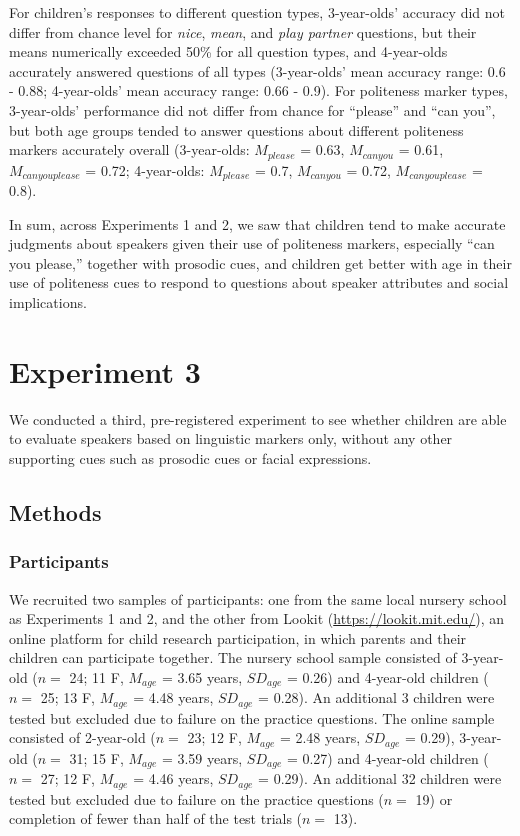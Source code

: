 \documentclass[10pt, letterpaper]{article}
\begin{document}
For children's responses to different question types, 3-year-olds'
accuracy did not differ from chance level for \emph{nice}, \emph{mean},
and \emph{play partner} questions, but their means numerically exceeded
50\% for all question types, and 4-year-olds accurately answered
questions of all types (3-year-olds' mean accuracy range: 0.6 - 0.88;
4-year-olds' mean accuracy range: 0.66 - 0.9). For politeness marker
types, 3-year-olds' performance did not differ from chance for
``please'' and ``can you'', but both age groups tended to answer
questions about different politeness markers accurately overall
(3-year-olds: \(M_{please}\) = 0.63, \(M_{can you}\) = 0.61,
\(M_{can you please}\) = 0.72; 4-year-olds: \(M_{please}\) = 0.7,
\(M_{can you}\) = 0.72, \(M_{can you please}\) = 0.8).

In sum, across Experiments 1 and 2, we saw that children tend to make
accurate judgments about speakers given their use of politeness markers,
especially ``can you please,'' together with prosodic cues, and children
get better with age in their use of politeness cues to respond to
questions about speaker attributes and social implications.

\section{Experiment 3}\label{experiment-3}

We conducted a third, pre-registered experiment to see whether children
are able to evaluate speakers based on linguistic markers only, without
any other supporting cues such as prosodic cues or facial expressions.

\subsection{Methods}\label{methods-2}

\subsubsection{Participants}\label{participants-2}

We recruited two samples of participants: one from the same local
nursery school as Experiments 1 and 2, and the other from Lookit
(\url{https://lookit.mit.edu/}), an online platform for child research
participation, in which parents and their children can participate
together. The nursery school sample consisted of 3-year-old (\(n=\) 24;
11 F, \(M_{age}\) = 3.65 years, \(SD_{age}\) = 0.26) and 4-year-old
children (\(n=\) 25; 13 F, \(M_{age}\) = 4.48 years, \(SD_{age}\) =
0.28). An additional 3 children were tested but excluded due to failure
on the practice questions. The online sample consisted of 2-year-old
(\(n=\) 23; 12 F, \(M_{age}\) = 2.48 years, \(SD_{age}\) = 0.29),
3-year-old (\(n=\) 31; 15 F, \(M_{age}\) = 3.59 years, \(SD_{age}\) =
0.27) and 4-year-old children (\(n=\) 27; 12 F, \(M_{age}\) = 4.46
years, \(SD_{age}\) = 0.29). An additional 32 children were tested but
excluded due to failure on the practice questions (\(n=\) 19) or
completion of fewer than half of the test trials (\(n=\) 13).
\end{document}

